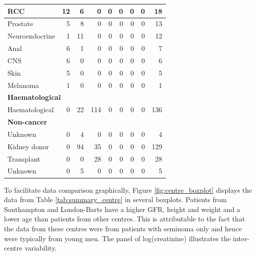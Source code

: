 \documentclass[11pt,]{article}
\begin{document}
\begin{table}
{\begin{tabular}[t]{l|r|r|r|r|r|r|r|r}
\hline
\hspace{1em}RCC & 12 & 6 & 0 & 0 & 0 & 0 & 0 & 18\\
\hline
\hspace{1em}Prostate & 5 & 8 & 0 & 0 & 0 & 0 & 0 & 13\\
\hline
\hspace{1em}Neuroendocrine & 1 & 11 & 0 & 0 & 0 & 0 & 0 & 12\\
\hline
\hspace{1em}Anal & 6 & 1 & 0 & 0 & 0 & 0 & 0 & 7\\
\hline
\hspace{1em}CNS & 6 & 0 & 0 & 0 & 0 & 0 & 0 & 6\\
\hline
\hspace{1em}Skin & 5 & 0 & 0 & 0 & 0 & 0 & 0 & 5\\
\hline
\hspace{1em}Melanoma & 1 & 0 & 0 & 0 & 0 & 0 & 0 & 1\\
\hline
\multicolumn{9}{l}{\textbf{Haematological}}\\
\hline
\hspace{1em}Haematological & 0 & 22 & 114 & 0 & 0 & 0 & 0 & 136\\
\hline
\multicolumn{9}{l}{\textbf{Non-cancer}}\\
\hline
\hspace{1em}\hspace{1em}Unknown & 0 & 4 & 0 & 0 & 0 & 0 & 0 & 4\\
\hline
\hspace{1em}Kidney donor & 0 & 94 & 35 & 0 & 0 & 0 & 0 & 129\\
\hline
\hspace{1em}Transplant & 0 & 0 & 28 & 0 & 0 & 0 & 0 & 28\\
\hline
Unknown & 0 & 5 & 0 & 0 & 0 & 0 & 0 & 5\\
\hline
\end{tabular}}
\end{table}

To facilitate data comparison graphically, Figure
\ref{fig:centre_boxplot} displays the data from Table
\ref{tab:summary_centre} in several boxplots. Patients from Southampton
and London-Barts have a higher GFR, height and weight and a lower age
than patients from other centres. This is attributable to the fact that
the data from these centres were from patients with seminoma only and
hence were typically from young men. The panel of log(creatinine)
illustrates the inter-centre variability.
\end{document}
